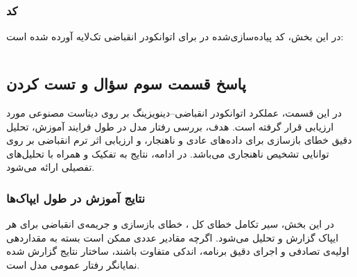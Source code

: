 \documentclass{article}
\begin{document}
\subsubsection{کد}
در این بخش، کد پیاده‌سازی‌شده در  برای اتوانکودر انقباضی تک‌لایه آورده شده است:

\begin{LTR}
	\inputminted{python}{CODE/MLHW2Q4.py}
\end{LTR}


\subsection{پاسخ قسمت سوم سؤال و تست کردن}
در این قسمت، عملکرد اتوانکودر انقباضی–دینویزینگ  بر روی دیتاست مصنوعی مورد ارزیابی قرار گرفته است. هدف، بررسی رفتار مدل در طول فرایند آموزش، تحلیل دقیق خطای بازسازی برای داده‌های عادی و ناهنجار، و ارزیابی اثر ترم انقباضی بر روی توانایی تشخیص ناهنجاری می‌باشد. در ادامه، نتایج به تفکیک و همراه با تحلیل‌های تفصیلی ارائه می‌شود.

\subsubsection{نتایج آموزش در طول ایپاک‌ها}

در این بخش، سیر تکامل خطای کل ، خطای بازسازی  و جریمه‌ی انقباضی برای هر ایپاک گزارش و تحلیل می‌شود. اگرچه مقادیر عددی ممکن است بسته به مقداردهی اولیه‌ی تصادفی و اجرای دقیق برنامه، اندکی متفاوت باشند، ساختار نتایج گزارش شده نمایانگر رفتار عمومی مدل است.
\end{document}
